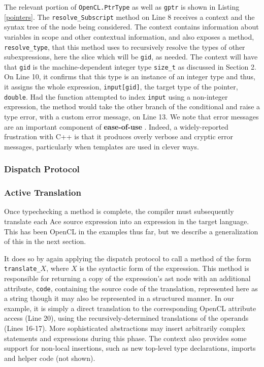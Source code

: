 \documentclass[9pt,preprint]{sigplanconf}
\begin{document}
The relevant portion of \verb|OpenCL.PtrType| as well as \verb|gptr| is shown in Listing \ref{pointers}. The \verb|resolve_Subscript| method on Line 8 receives a context and the syntax tree of the node being considered. The context contains information about variables in scope and other contextual information, and also exposes a method, \verb|resolve_type|, that this method uses to recursively resolve the types of other subexpressions, here the slice which will be \verb|gid|, as needed. The context will have that \verb|gid| is the machine-dependent integer type \verb|size_t| as discussed in Section 2. On Line 10, it confirms that this type is an instance of an integer type and thus, it assigns the whole expression, \verb|input[gid]|, the target type of the pointer, \verb|double|. Had the function attempted to index \verb|input| using a non-integer expression, the method would take the other branch of the conditional and raise a type error, with a custom error message, on Line 13. We note that error messages are an important component of \textbf{ease-of-use} \cite{marceau2011measuring}. Indeed, a widely-reported frustration with C++ is that it produces overly verbose and cryptic error messages, particularly when templates are used in clever ways.

\subsubsection{Dispatch Protocol}




\subsubsection{Active Translation}
Once typechecking a method is complete, the compiler must subsequently translate each Ace source expression into an expression in the target language. This has been OpenCL in the examples thus far, but we describe a generalization of this in the next section. 

It does so by again applying the dispatch protocol to call a method of the form \verb|translate_|$X$, where $X$ is the syntactic form of the expression. This method is responsible for returning a copy of the expression's ast node with an additional attribute, \verb|code|, containing the source code of the translation, represented here as a string though it may also be represented in a structured manner. In our example, it is simply a direct translation to the corresponding OpenCL attribute access (Line 20), using the recursively-determined translations of the operands (Lines 16-17).  More sophisticated abstractions may insert arbitrarily complex statements and expressions during this phase. The context also provides some support for non-local insertions, such as new top-level type declarations, imports and helper code (not shown).
\end{document}
